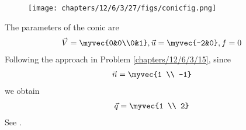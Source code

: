	\begin{figure}[H]
		\centering
 \texttt{[image: chapters/12/6/3/27/figs/conicfig.png]}
		\caption{}
		\label{fig:12/6/3/27}
  	\end{figure}
The parameters of the conic are
\begin{align}
 \vec{V} = \myvec{0&0\\0&1},  \vec{u} = \myvec{-2&0}, f = 0 
\end{align}
Following the approach in Problem 
\ref{chapters/12/6/3/15},
since
\begin{align}
	\vec{n} = \myvec{1 \\ -1}
\end{align}
we obtain
\begin{align}
	\vec{q} = \myvec{1 \\ 2}
\end{align}
See 
		.

